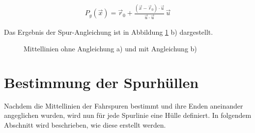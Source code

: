 \begin{ceqn}
\begin{align}
\label{eq_orthPro}
    P_g(\vec x) =  \vec r_0 + \frac{( \vec x - \vec r_0 ) \cdot \vec u}{\vec u \cdot \vec u} \, \vec u
\end{align}
\end{ceqn}

Das Ergebnis der Spur-Angleichung ist in Abbildung \ref{fig:real2_lane_alignment} b) dargestellt.

\begin{figure}[H]
    \centering
    \qquad \qquad
    \caption{Mittellinien ohne Angleichung a) und mit Angleichung b)}
    \label{fig:real2_lane_alignment}
\end{figure}


\section{Bestimmung der Spurhüllen}
\label{sec:real2_define_lane_envelope}

Nachdem die Mittellinien der Fahrspuren bestimmt und ihre Enden aneinander angeglichen wurden, wird nun für jede Spurlinie
eine Hülle definiert. In folgendem Abschnitt wird beschrieben, wie diese erstellt werden.

